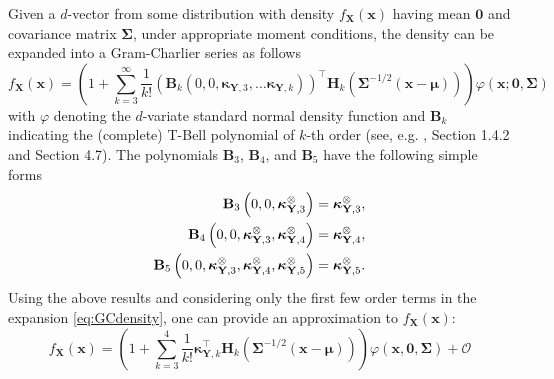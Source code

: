 Given a \(d\)-vector from some distribution with density \(f_{\mathbf{X}}\left( \mathbf{x}\right)\) having mean \(\mathbf{0}\) and covariance matrix \(\boldsymbol{\Sigma}\), under appropriate moment conditions, the density can be expanded into a Gram-Charlier series as follows
\begin{equation}
f_{\mathbf{X}}\left(  \mathbf{x}\right)  = \left(  1 +\sum_{k=3}^{\infty }
  \frac{1}{k!}\left( \mathbf{B}_{k} \left(  0,0,\boldsymbol{\kappa}_{\mathbf{Y},3}%
  ,\ldots\boldsymbol{\kappa}_{\mathbf{Y},k}\right)  \right)  ^{\top}
  \mathbf{H}_{k}\left(    \boldsymbol{\Sigma}^{-1/2}  \left(\mathbf{x}-\boldsymbol{\mu} \right)%
    \right)   \right)   \varphi\left(  \mathbf{x}%
  ;\mathbf{0},\boldsymbol{\Sigma}\right) 
  \label{eq:GCdensity}
\end{equation}
with \(\varphi\) denoting the \(d\)-variate standard normal density function and \(\mathbf{B}_k\) indicating the (complete) T-Bell polynomial of \(k\)-th order (see, e.g. \citet{terdik2021multivariate}, Section 1.4.2 and Section 4.7). The
polynomials \(\mathbf{B}_{3}\), \(\mathbf{B}_{4}\), and \(\mathbf{B}_{5}\) have
the following simple forms
\begin{align*}
\mathbf{B}_{3}\left( 0,0,\boldsymbol{\kappa }_{\mathbf{Y},3}^{\otimes
}\right) & =\boldsymbol{\kappa }_{\mathbf{Y},3}^{\otimes }, \\
\mathbf{B}_{4}\left( 0,0,\boldsymbol{\kappa }_{\mathbf{Y},3}^{\otimes },%
\boldsymbol{\kappa }_{\mathbf{Y},4}^{\otimes }\right) & =\boldsymbol{\kappa }%
_{\mathbf{Y},4}^{\otimes }, \\
\mathbf{B}_{5}\left( 0,0,\boldsymbol{\kappa }_{\mathbf{Y},3}^{\otimes },%
\boldsymbol{\kappa }_{\mathbf{Y},4}^{\otimes },\boldsymbol{\kappa }_{\mathbf{%
        Y},5}^{\otimes }\right) & =\boldsymbol{\kappa }_{\mathbf{Y},5}^{\otimes }.
\end{align*}
Using the above results and considering only the first few order terms in the expansion \eqref{eq:GCdensity}, one can provide an approximation to \(f_{\mathbf{X}}\left( \mathbf{x}\right)\):
\begin{equation}
f_{\mathbf{X}}\left(  \mathbf{x}\right)  =\left(  1+\sum_{k=3}^{4}%
\frac{1}{k!}\boldsymbol{\kappa}_{\mathbf{Y},k}^{\top}\mathbf{H}%
_{k}\left(   \boldsymbol{\Sigma }^{-1/2}%
(\mathbf{x}-\boldsymbol{\mu})\right)   \right)  \varphi\left(  \mathbf{x}, \mathbf{0},  \boldsymbol{\Sigma}\right)  +\mathcal{O}
\label{eq:SGCE0}
\end{equation}
